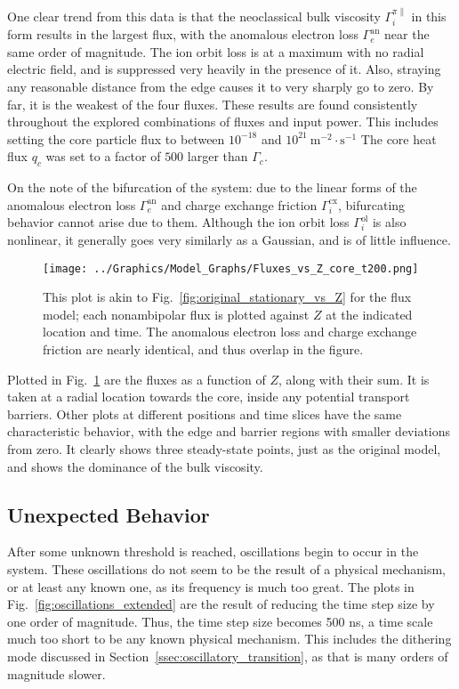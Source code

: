 One clear trend from this data is that the neoclassical bulk viscosity $\Gamma_i^{\pi\parallel}$ in this form results in the largest flux, with the anomalous electron loss $\Gamma_e^\text{an}$ near the same order of magnitude.
The ion orbit loss is at a maximum with no radial electric field, and is suppressed very heavily in the presence of it.
Also, straying any reasonable distance from the edge causes it to very sharply go to zero.
By far, it is the weakest of the four fluxes.
These results are found consistently throughout the explored combinations of fluxes and input power.
This includes setting the core particle flux to between $10^{-18}$ and $10^{21}~\text{m}^{-2}\cdot\text{s}^{-1}$
The core heat flux $q_c$ was set to a factor of $500$ larger than $\Gamma_c$.

On the note of the bifurcation of the system: due to the linear forms of the anomalous electron loss $\Gamma_e^\text{an}$ and charge exchange friction $\Gamma_i^\text{cx}$, bifurcating behavior cannot arise due to them.
Although the ion orbit loss $\Gamma_i^\text{ol}$ is also nonlinear, it generally goes very similarly as a Gaussian, and is of little influence.

\begin{figure}[!htb] %
	\centering
	\texttt{[image: ../Graphics/Model\_Graphs/Fluxes\_vs\_Z\_core\_t200.png]}
	\caption{This plot is akin to Fig.~\ref{fig:original_stationary_vs_Z} for the flux model; each nonambipolar flux is plotted against $Z$ at the indicated location and time.
	The anomalous electron loss and charge exchange friction are nearly identical, and thus overlap in the figure.}
	\label{fig:fluxes_steady-state}
\end{figure}

Plotted in Fig.~\ref{fig:fluxes_steady-state} are the fluxes as a function of $Z$, along with their sum.
It is taken at a radial location towards the core, inside any potential transport barriers.
Other plots at different positions and time slices have the same characteristic behavior, with the edge and barrier regions with smaller deviations from zero.
It clearly shows three steady-state points, just as the original model, and shows the dominance of the bulk viscosity.

\subsection{Unexpected Behavior} \label{ssec:unexpected}
After some unknown threshold is reached, oscillations begin to occur in the system.
These oscillations do not seem to be the result of a physical mechanism, or at least any known one, as its frequency is much too great.
The plots in Fig.~\ref{fig:oscillations_extended} are the result of reducing the time step size by one order of magnitude.
Thus, the time step size becomes 500 ns, a time scale much too short to be any known physical mechanism.
This includes the dithering mode discussed in Section~\ref{ssec:oscillatory_transition}, as that is many orders of magnitude slower.

